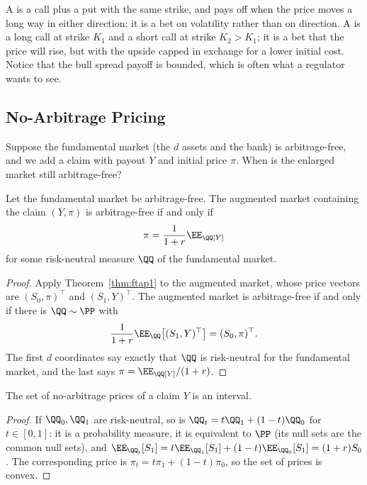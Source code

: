 A  is a call plus a put with the same strike, and pays off when the price moves a long way in either direction: it is a bet on volatility rather than on direction. A  is a long call at strike $K_1$ and a short call at strike $K_2 > K_1$; it is a bet that the price will rise, but with the upside capped in exchange for a lower initial cost. Notice that the bull spread payoff is bounded, which is often what a regulator wants to see.

\subsection{No-Arbitrage Pricing}

Suppose the fundamental market (the $d$ assets and the bank) is arbitrage-free, and we add a claim with payout $Y$ and initial price $\pi$. When is the enlarged market still arbitrage-free?

\begin{theorem}\label{thm:na-pricing}
	Let the fundamental market be arbitrage-free. The augmented market containing the claim $(Y, \pi)$ is arbitrage-free if and only if
	$$
	\pi = \frac{1}{1+r}\EE_\QQ[Y]
	$$
	for some risk-neutral measure $\QQ$ of the fundamental market.
\end{theorem}

\begin{proof}
	Apply Theorem~\ref{thm:ftap1} to the augmented market, whose price vectors are $(S_0, \pi)^\top$ and $(S_1, Y)^\top$. The augmented market is arbitrage-free if and only if there is $\QQ \sim \PP$ with
	$$
	\frac{1}{1+r}\EE_\QQ\big[(S_1, Y)^\top\big] = (S_0, \pi)^\top.
	$$
	The first $d$ coordinates say exactly that $\QQ$ is risk-neutral for the fundamental market, and the last says $\pi = \EE_\QQ[Y]/(1+r)$.
\end{proof}

\begin{proposition}
	The set of no-arbitrage prices of a claim $Y$ is an interval.
\end{proposition}

\begin{proof}
	If $\QQ_0, \QQ_1$ are risk-neutral, so is $\QQ_t = t\QQ_1 + (1-t)\QQ_0$ for $t \in [0,1]$: it is a probability measure, it is equivalent to $\PP$ (its null sets are the common null sets), and $\EE_{\QQ_t}[S_1] = t\EE_{\QQ_1}[S_1] + (1-t)\EE_{\QQ_0}[S_1] = (1+r)S_0$. The corresponding price is $\pi_t = t\pi_1 + (1-t)\pi_0$, so the set of prices is convex.
\end{proof}

